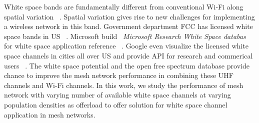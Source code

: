 White space bands are fundamentally different from conventional Wi-Fi along spatial variation ~\cite{bahl2009white}. 
Spatial variation gives rise to new challenges for implementing a wireless network in this band. 
Government department FCC has licensed white space bands in US ~\cite{fccwhitespace}.
Microsoft build ~\emph{Microsoft Research White Space databas} for white space application reference ~\cite{msdatabase}. 
Google even visualize the licensed white space channels in cities all over US and provide API for research and commerical users ~\cite{googledatabase}.
The white space potential and the open free spectrum database provide chance to improve the mesh network performance in combining
 these UHF channels and Wi-Fi channels.
 In this work, we study the performance of mesh network with varying number of available white space channels at varying population densities as offerload to offer solution for white space channel application in mesh networks. 





 

